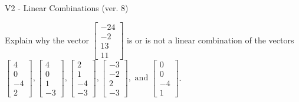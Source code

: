 \begin{exercise}
  \begin{exerciseTitle}V2 - Linear Combinations (ver. 8)\end{exerciseTitle}
  \begin{exerciseStatement}
    Explain why the vector \(\left[\begin{array}{c}
-24 \\
-2 \\
13 \\
11
\end{array}\right]\)  is or is not a linear 
	combination of the vectors \(\left[\begin{array}{c}
4 \\
0 \\
-4 \\
2
\end{array}\right] , \left[\begin{array}{c}
4 \\
0 \\
1 \\
-3
\end{array}\right] , \left[\begin{array}{c}
2 \\
1 \\
-4 \\
-3
\end{array}\right] , \left[\begin{array}{c}
-3 \\
-2 \\
2 \\
-3
\end{array}\right] , \text{ and } \left[\begin{array}{c}
0 \\
0 \\
-4 \\
1
\end{array}\right]\).
	



\end{exerciseStatement}
\end{exercise}
